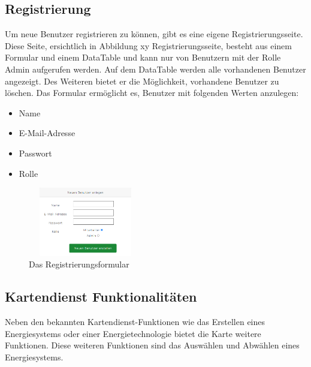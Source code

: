 \subsection{Registrierung}
Um neue Benutzer registrieren zu können, gibt es eine eigene Registrierungsseite. Diese Seite, ersichtlich in Abbildung xy Registrierungsseite, besteht aus einem Formular und einem DataTable und kann nur von Benutzern mit der Rolle Admin aufgerufen werden. Auf dem DataTable werden alle vorhandenen Benutzer angezeigt. Des Weiteren bietet er die Möglichkeit, vorhandene Benutzer zu löschen. Das Formular ermöglicht es, Benutzer mit folgenden Werten anzulegen:
\begin{itemize}
	\item Name  
	\item E-Mail-Adresse
	\item Passwort  
	\item Rolle 
\end{itemize}
\begin{figure}[h]
	\centering
	\includegraphics[height=3cm,width=5cm]{images/RegisterFormular}
	\caption{Das Registrierungsformular}
	\label{fig:Register Formular}
\end{figure}



\subsection{Kartendienst Funktionalitäten}
Neben den bekannten Kartendienst-Funktionen wie das Erstellen eines Energiesystems oder einer Energietechnologie bietet die Karte weitere Funktionen. Diese weiteren Funktionen sind das Auswählen und Abwählen eines Energiesystems.

